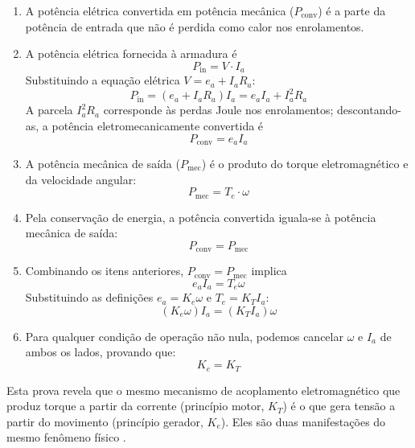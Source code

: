 \begin{enumerate}
    \item A potência elétrica convertida em potência mecânica ($P_{\text{conv}}$) é a parte da potência de entrada que não é perdida como calor nos enrolamentos.

    \item A potência elétrica fornecida à armadura é
    \begin{equation}
        P_{\text{in}} = V \cdot I_a
    \end{equation}
    Substituindo a equação elétrica $V = e_a + I_a R_a$:
    \begin{equation}
        P_{\text{in}} = (e_a + I_a R_a) I_a = e_a I_a + I_a^2 R_a
    \end{equation}
    A parcela $I_a^2 R_a$ corresponde às perdas Joule nos enrolamentos; descontando-as, a potência eletromecanicamente convertida é
    \begin{equation}
        P_{\text{conv}} = e_a I_a
    \end{equation}

    \item A potência mecânica de saída ($P_{\text{mec}}$) é o produto do torque eletromagnético e da velocidade angular:
    \begin{equation}
        P_{\text{mec}} = T_e \cdot \omega
    \end{equation}

    \item Pela conservação de energia, a potência convertida iguala-se à potência mecânica de saída:
    \begin{equation}
        P_{\text{conv}} = P_{\text{mec}}
    \end{equation}

    \item Combinando os itens anteriores, $P_{\text{conv}} = P_{\text{mec}}$ implica
    \begin{equation}
        e_a I_a = T_e \omega
    \end{equation}
    Substituindo as definições $e_a = K_e \omega$ e $T_e = K_T I_a$:
    \begin{equation}
        (K_e \omega) I_a = (K_T I_a) \omega
    \end{equation}

    \item Para qualquer condição de operação não nula, podemos cancelar $\omega$ e $I_a$ de ambos os lados, provando que:
    \begin{equation}
        K_e = K_T
    \end{equation}
\end{enumerate}
Esta prova revela que o mesmo mecanismo de acoplamento eletromagnético que produz torque a partir da corrente (princípio motor, $K_T$) é o que gera tensão a partir do movimento (princípio gerador, $K_e$). Eles são duas manifestações do mesmo fenômeno físico \parencite{zoltan2012understanding, garcia1997modelagem}.

